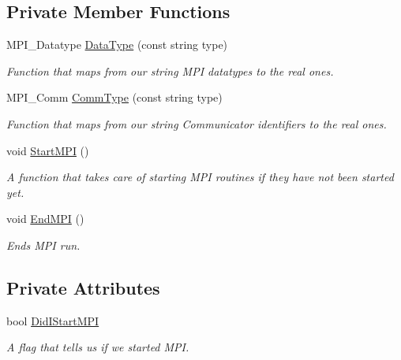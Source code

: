\subsection*{Private Member Functions}
\begin{DoxyCompactItemize}
\item 
MPI\_\-Datatype \hyperlink{classJKBuilder_1_1MPIManager_a10170badfc93237bc6726ea1571da1e2}{DataType} (const string type)
\begin{DoxyCompactList}\small\item\em Function that maps from our string MPI datatypes to the real ones. \item\end{DoxyCompactList}\item 
MPI\_\-Comm \hyperlink{classJKBuilder_1_1MPIManager_aa684a7e66e1a5459234d78e7e4c0be6e}{CommType} (const string type)
\begin{DoxyCompactList}\small\item\em Function that maps from our string Communicator identifiers to the real ones. \item\end{DoxyCompactList}\item 
void \hyperlink{classJKBuilder_1_1MPIManager_a5097097fb8c69072f75bfc3a496abe1e}{StartMPI} ()
\begin{DoxyCompactList}\small\item\em A function that takes care of starting MPI routines if they have not been started yet. \item\end{DoxyCompactList}\item 
void \hyperlink{classJKBuilder_1_1MPIManager_a2eaaa3e6682681e7f143eabf2f3b2a22}{EndMPI} ()
\begin{DoxyCompactList}\small\item\em Ends MPI run. \item\end{DoxyCompactList}\end{DoxyCompactItemize}
\subsection*{Private Attributes}
\begin{DoxyCompactItemize}
\item 
bool \hyperlink{classJKBuilder_1_1MPIManager_a872aa5f69571aa82d846d4e359c83180}{DidIStartMPI}
\begin{DoxyCompactList}\small\item\em A flag that tells us if we started MPI. \item\end{DoxyCompactList}\end{DoxyCompactItemize}
